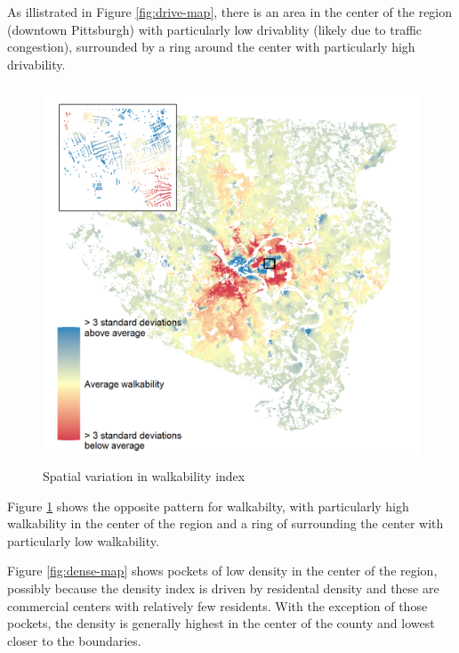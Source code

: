 \documentclass[
]{book}
\begin{document}
As illistrated in Figure
\ref{fig:drive-map}, there is an area in the center of the
region (downtown Pittsburgh) with particularly low
drivablity (likely due to traffic congestion), surrounded
by a ring around the center with particularly high
drivability.

\begin{figure}
\includegraphics[width=1\linewidth]{04_figures/walkable} \caption{Spatial variation in walkability index}\label{fig:walk-map}
\end{figure}

Figure
\ref{fig:walk-map} shows the opposite pattern for walkabilty,
with particularly high walkability in the center of the
region and a ring of surrounding the center with particularly low walkability.

Figure \ref{fig:dense-map} shows pockets of low density in the
center of the region, possibly because the density index is
driven by residental density and these are commercial centers
with relatively few residents. With the exception of those
pockets, the density is generally highest in the center of the
county and lowest closer to the boundaries.
\end{document}
